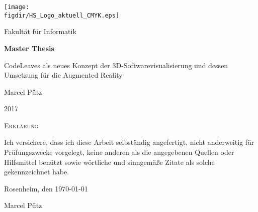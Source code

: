 \begin{titlepage}

\raggedleft
\sffamily

\texttt{[image: \\figdir/HS\_Logo\_aktuell\_CMYK.eps]}

\centering
\LARGE
Fakultät für Informatik
\vfill

\huge
\textbf{Master Thesis}
\vspace{1cm}

\LARGE
CodeLeaves als neues Konzept der 3D-Softwarevisualisierung und dessen Umsetzung für die Augmented Reality
\vspace{1cm}

\vfill
\vspace{2cm}
\Large
Marcel Pütz

2017


\end{titlepage}

\cleardoubleemptypage

{
\large
\thispagestyle{empty}
\vspace*{\fill}

\noindent
\textsc{Erklärung}

\medskip

\noindent
Ich versichere, dass ich diese Arbeit selbständig
angefertigt, nicht anderweitig für Prüfungszwecke
vorgelegt, keine anderen als die angegebenen Quellen
oder Hilfsmittel benützt sowie wörtliche und
sinngemäße Zitate als solche gekennzeichnet habe.

\bigskip

\noindent
Rosenheim, den \today

\vspace*{2cm}

\noindent
Marcel Pütz
}

